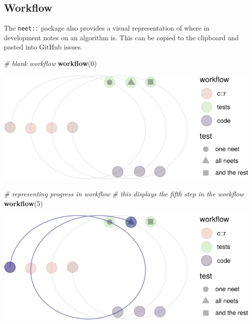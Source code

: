 \documentclass[
]{article}
\newenvironment{Shaded}{\begin{snugshade}}{\end{snugshade}}
\newcommand{\CommentTok}[1]{\textcolor[rgb]{0.56,0.35,0.01}{\textit{#1}}}
\newcommand{\DecValTok}[1]{\textcolor[rgb]{0.00,0.00,0.81}{#1}}
\newcommand{\KeywordTok}[1]{\textcolor[rgb]{0.13,0.29,0.53}{\textbf{#1}}}
\newcommand{\NormalTok}[1]{#1}
\begin{document}
\hypertarget{workflow}{%
\subsection{Workflow}\label{workflow}}

The \texttt{neet::} package also provides a visual representation of where in development notes on an algorithm is. This can be copied to the clipboard and pasted into GitHub issues.

\begin{Shaded}
\begin{Highlighting}[]
\CommentTok{\# blank workflow}
\KeywordTok{workflow}\NormalTok{(}\DecValTok{0}\NormalTok{)}
\end{Highlighting}
\end{Shaded}

\begin{center}\includegraphics{when-is-done-done_files/figure-latex/unnamed-chunk-6-1} \end{center}

\begin{Shaded}
\begin{Highlighting}[]
\CommentTok{\# representing progress in workflow}
\CommentTok{\# this displays the fifth step in the workflow}
\KeywordTok{workflow}\NormalTok{(}\DecValTok{5}\NormalTok{)}
\end{Highlighting}
\end{Shaded}

\begin{center}\includegraphics{when-is-done-done_files/figure-latex/unnamed-chunk-6-2} \end{center}
\end{document}
